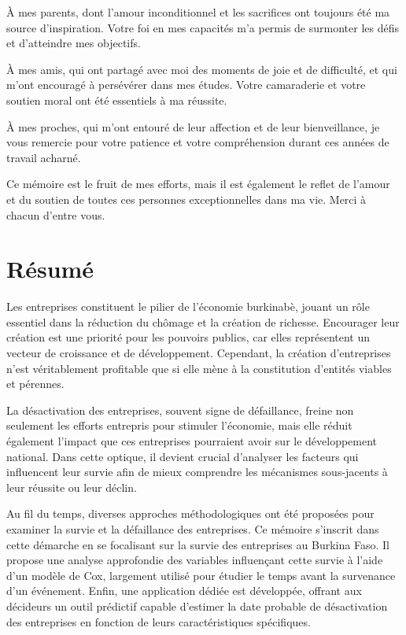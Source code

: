 \documentclass[a4paper,12pt]{report}
\begin{document}
À mes parents, dont l'amour inconditionnel et les sacrifices ont toujours été ma source d'inspiration. Votre foi en mes capacités m’a permis de surmonter les défis et d’atteindre mes objectifs.

À mes amis, qui ont partagé avec moi des moments de joie et de difficulté, et qui m'ont encouragé à persévérer dans mes études. Votre camaraderie et votre soutien moral ont été essentiels à ma réussite.

À mes proches, qui m'ont entouré de leur affection et de leur bienveillance, je vous remercie pour votre patience et votre compréhension durant ces années de travail acharné.

Ce mémoire est le fruit de mes efforts, mais il est également le reflet de l'amour et du soutien de toutes ces personnes exceptionnelles dans ma vie. Merci à chacun d'entre vous.
\chapter*{Résumé}
Les entreprises constituent le pilier de l'économie burkinabè, jouant un rôle essentiel dans la réduction du chômage et la création de richesse. Encourager leur création est une priorité pour les pouvoirs publics, car elles représentent un vecteur de croissance et de développement. Cependant, la création d'entreprises n'est véritablement profitable que si elle mène à la constitution d'entités viables et pérennes.

La désactivation des entreprises, souvent signe de défaillance, freine non seulement les efforts entrepris pour stimuler l'économie, mais elle réduit également l'impact que ces entreprises pourraient avoir sur le développement national. Dans cette optique, il devient crucial d'analyser les facteurs qui influencent leur survie afin de mieux comprendre les mécanismes sous-jacents à leur réussite ou leur déclin.

Au fil du temps, diverses approches méthodologiques ont été proposées pour examiner la survie et la défaillance des entreprises. Ce mémoire s’inscrit dans cette démarche en se focalisant sur la survie des entreprises au Burkina Faso. Il propose une analyse approfondie des variables influençant cette survie à l’aide d’un modèle de Cox, largement utilisé pour étudier le temps avant la survenance d'un événement. Enfin, une application dédiée est développée, offrant aux décideurs un outil prédictif capable d'estimer la date probable de désactivation des entreprises en fonction de leurs caractéristiques spécifiques.
\end{document}
